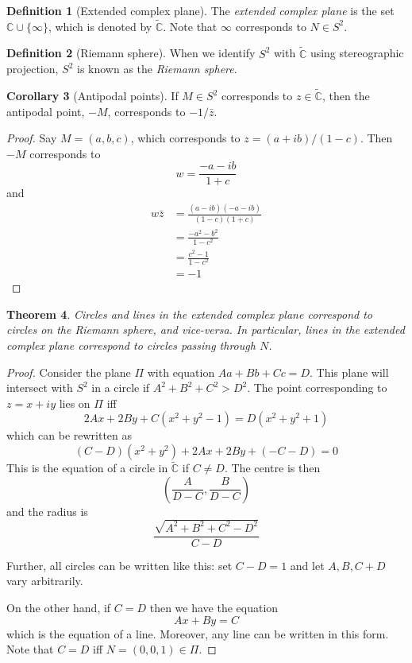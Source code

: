 \documentclass[10pt,fleqn]{article}
\newcommand{\comps}{\mathbb{C}}
\theoremstyle{definition} \newtheorem{defn}{Definition}[section]
\theoremstyle{plain}      \newtheorem{thm}[defn]{Theorem}
\theoremstyle{definition} \newtheorem{prop}[defn]{Proposition}
\theoremstyle{plain}      \newtheorem{lem}[defn]{Lemma}
\theoremstyle{definition} \newtheorem{cor}[defn]{Corollary}
\theoremstyle{definition} \newtheorem{ex}[defn]{Example}
\theoremstyle{definition} \newtheorem{rem}[defn]{Remark}
\begin{document}
\begin{defn}[Extended complex plane]
    The \emph{extended complex plane} is the set $\comps\cup\{\infty\}$, which is denoted by $\tilde{\comps}$.
    Note that $\infty$ corresponds to $N\in S^2$.
\end{defn}

\begin{defn}[Riemann sphere]
    When we identify $S^2$ with $\tilde{\comps}$ using stereographic projection, $S^2$ is known as the \emph{Riemann sphere}.
\end{defn}

\begin{cor}[Antipodal points]
    If $M\in S^2$ corresponds to $z\in\tilde{\comps}$, then the antipodal point, $-M$, corresponds to $-1/\bar{z}$.
\end{cor}

\begin{proof}
    Say $M=(a,b,c)$, which corresponds to $z=(a+ib)/(1-c)$.
    Then $-M$ corresponds to
    \[
        w=
        \frac{-a-ib}{1+c}
    \]
    and
    \begin{align*}
        w\bar{z}
        &=
        \frac{(a-ib)(-a-ib)}{(1-c)(1+c)}\\
        &=
        \frac{-a^2-b^2}{1-c^2}\\
        &=
        \frac{c^2-1}{1-c^2}\\
        &=
        -1
    \end{align*}
\end{proof}

\begin{thm}
    Circles and lines in the extended complex plane correspond to circles on the Riemann sphere, and vice-versa.
    In particular, lines in the extended complex plane correspond to circles passing through $N$.
\end{thm}

\begin{proof}
    Consider the plane $\Pi$ with equation $Aa+Bb+Cc=D$.
    This plane will intersect with $S^2$ in a circle if $A^2+B^2+C^2>D^2$.
    The point corresponding to $z=x+iy$ lies on $\Pi$ iff
    \[
        2Ax+2By+C(x^2+y^2-1)=
        D(x^2+y^2+1)
    \]
    which can be rewritten as
    \[
        (C-D)(x^2+y^2)+2Ax+2By+(-C-D)=0
    \]
    This is the equation of a circle in $\tilde{\comps}$ if $C\neq D$.
    The centre is then
    \[
    \left(\frac{A}{D-C},\frac{B}{D-C}\right)
    \]
    and the radius is
    \[
    \frac{\sqrt{A^2+B^2+C^2-D^2}}{C-D}
    \]

    Further, all circles can be written like this: set $C-D=1$ and let $A,B,C+D$ vary arbitrarily.

    On the other hand, if $C=D$ then we have the equation
    \[
        Ax+By=C
    \]
    which is the equation of a line.
    Moreover, any line can be written in this form.
    Note that $C=D$ iff $N=(0,0,1)\in\Pi$.
\end{proof}
\end{document}
